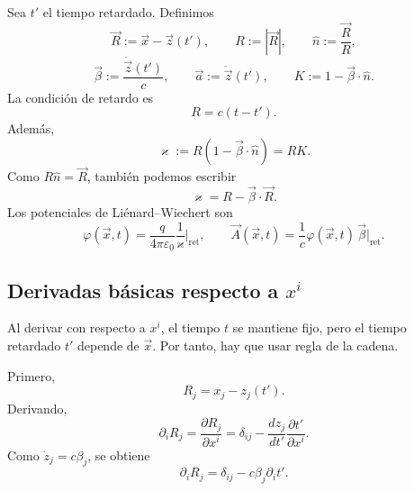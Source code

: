 \documentclass{article}
\numberwithin{equation}{section}
\newcommand{\eps}{\varepsilon_0}
\newcommand{\ret}{\big|_{\mathrm{ret}}}
\newcommand{\bv}{\vec{\beta}}
\newcommand{\av}{\vec{a}}
\newcommand{\Rv}{\vec{R}}
\newcommand{\nh}{\hat{n}}
\newcommand{\K}{K}
\begin{document}
Sea $t'$ el tiempo retardado. Definimos
\begin{equation*}
  \Rv:=\vec{x}-\vec{z}(t'),
  \qquad
  R:=|\Rv|,
  \qquad
  \nh:=\frac{\Rv}{R},
\end{equation*}
\begin{equation*}
  \bv:=\frac{\dot{\vec{z}}(t')}{c},
  \qquad
  \av:=\ddot{\vec{z}}(t'),
  \qquad
  \K:=1-\bv\cdot\nh.
\end{equation*}
La condici\'on de retardo es
\begin{equation*}
  R=c(t-t').
\end{equation*}
Adem\'as,
\begin{equation*}
  \varkappa:=R(1-\bv\cdot\nh)=R\K.
\end{equation*}
Como $R\nh=\Rv$, tambi\'en podemos escribir
\begin{equation}
  \varkappa=R-\bv\cdot\Rv.
  \label{eq:kappa_alt}
\end{equation}
Los potenciales de Li\'enard--Wiechert son
\begin{equation}
  \varphi(\vec{x},t)
  =\frac{q}{4\pi\eps}\frac{1}{\varkappa}\ret,
  \qquad
  \vec{A}(\vec{x},t)
  =\frac{1}{c}\varphi(\vec{x},t)\,\bv\ret.
  \label{eq:potenciales}
\end{equation}

\subsection{Derivadas b\'asicas respecto a $x^i$}

Al derivar con respecto a $x^i$, el tiempo $t$ se mantiene fijo, pero el
tiempo retardado $t'$ depende de $\vec{x}$. Por tanto, hay que usar regla de
la cadena.

Primero,
\begin{equation*}
  R_j=x_j-z_j(t').
\end{equation*}
Derivando,
\begin{equation*}
  \partial_i R_j
  =\frac{\partial R_j}{\partial x^i}
  =\delta_{ij}-\frac{d z_j}{dt'}\frac{\partial t'}{\partial x^i}.
\end{equation*}
Como $\dot{z}_j=c\beta_j$, se obtiene
\begin{equation}
  \boxed{
  \partial_i R_j=\delta_{ij}-c\beta_j\partial_i t'.
  }
  \label{eq:partial_Rj_1}
\end{equation}
\end{document}
